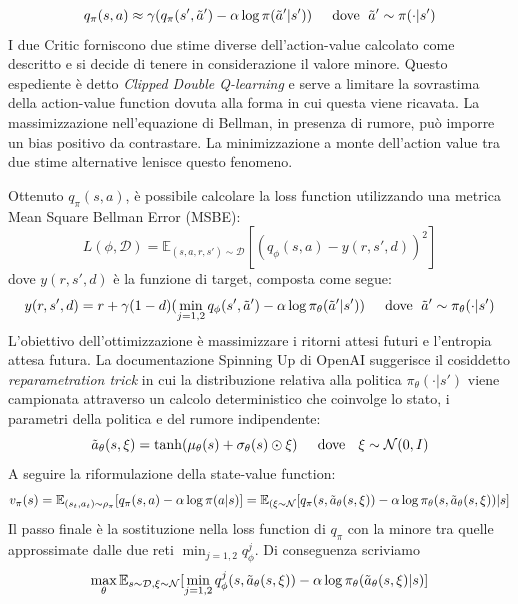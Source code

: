 \begin{equation}
    q_\pi(s,a) \approx \gamma (q_\pi(s',\Tilde{a}')-\alpha \log\pi(\Tilde{a}'|s'))\;\;\;\;\text{ dove }\;\Tilde{a}'\sim \pi(\cdot|s')
\end{equation}
I due Critic forniscono due stime diverse dell'action-value calcolato come descritto e si decide di tenere in considerazione il valore minore. Questo espediente è detto \textit{Clipped Double Q-learning} e serve a limitare la sovrastima della action-value function dovuta alla forma in cui questa viene ricavata. La massimizzazione nell'equazione di Bellman, in presenza di rumore, può imporre un bias positivo da contrastare. La minimizzazione a monte dell'action value tra due stime alternative lenisce questo fenomeno.


Ottenuto $q_\pi(s,a)$, è possibile calcolare la loss function utilizzando una metrica Mean Square Bellman Error (MSBE):
\begin{equation}
    L(\phi,\mathcal{D})= \mathbb{E}_{(s,a,r,s')\sim\mathcal{D}}[(q_\phi(s,a)-y(r,s',d))^2]
\end{equation}
dove $y(r,s',d)$ è la funzione di target, composta come segue:
\begin{equation}
    y(r,s',d)=r + \gamma(1-d) (\min_{j=1,2}q_\phi(s',\Tilde{a}')-\alpha \log\pi_\theta(\Tilde{a}'|s'))\;\;\;\; \text{ dove }\;\Tilde{a}'\sim \pi_\theta(\cdot|s')
\end{equation}
L'obiettivo dell'ottimizzazione è massimizzare i ritorni attesi futuri e l'entropia attesa futura. La documentazione Spinning Up di OpenAI \cite{openaiSAC2023} suggerisce il cosiddetto \textit{reparametration trick} in cui la distribuzione relativa alla politica $\pi_\theta(\cdot|s')$ viene campionata attraverso un calcolo deterministico che coinvolge lo stato, i parametri della politica e del rumore indipendente:
\begin{equation}
    \Tilde{a}_\theta (s,\xi) = \tanh (\mu_\theta(s)+\sigma_\theta(s)\odot\xi) \;\;\;\; \text{ dove }\;\ \xi \sim \mathcal{N}(0,I)
\end{equation}
A seguire la riformulazione della state-value function:
\begin{equation}
     v_\pi(s)= \mathbb{E}_{(s_t,a_t)\sim \rho_\pi}[q_\pi(s,a)-\alpha \log\pi(a|s)]=\mathbb{E}_{(\xi\sim \mathcal{N}}[q_\pi(s,\Tilde{a}_\theta(s,\xi))-\alpha \log \pi_\theta(s,\Tilde{a}_\theta(s,\xi))|s]
\end{equation}
Il passo finale è la sostituzione nella loss function di $q_\pi$ con la minore tra quelle approssimate dalle due reti $\min_{j=1,2} q_\phi^j$. Di conseguenza scriviamo
\begin{equation}
    \max_\theta \mathbb{E}_{s\sim\mathcal{D},\xi\sim \mathcal{N}}[\min_{j=1,2} q_\phi^j(s,\Tilde{a}_\theta(s,\xi))-\alpha \log \pi_\theta(\Tilde{a}_\theta(s,\xi)|s)]
\end{equation}

